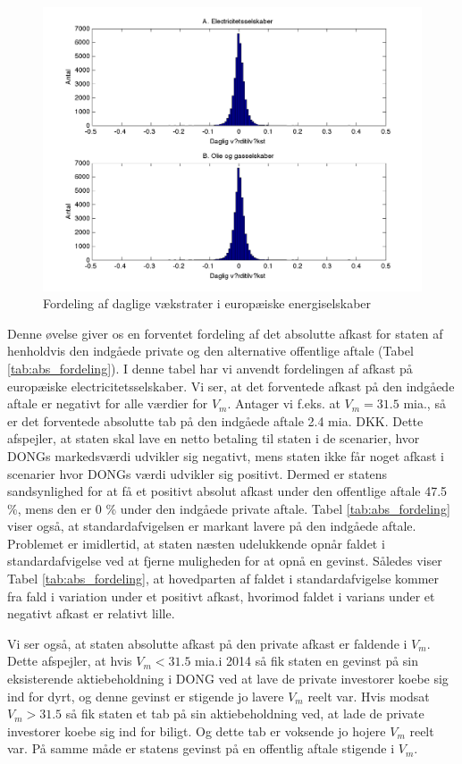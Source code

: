 \documentclass{article}
\begin{document}
\begin{figure}
\includegraphics[scale=0.8]{../matlab/figs/data_hist}
\caption{Fordeling af daglige v\ae{}kstrater i europ\ae{}iske energiselskaber}
\label{fig:data_hist}
\end{figure}

Denne øvelse giver os en forventet fordeling af det absolutte afkast for staten af henholdvis den indgåede private og den alternative offentlige aftale (Tabel \ref{tab:abs_fordeling}). I denne tabel har vi anvendt fordelingen af afkast på europæiske electricitetsselskaber. Vi ser, at det forventede afkast på den indgåede aftale er negativt for alle værdier for $V_m$. Antager vi f.eks. at $V_m=31.5$ mia., så er det forventede absolutte tab på den indgåede aftale 2.4 mia. DKK. Dette afspejler, at staten skal lave en netto betaling til staten i de scenarier, hvor DONGs markedsværdi udvikler sig negativt, mens staten ikke får noget afkast i scenarier hvor DONGs værdi udvikler sig positivt. Dermed er statens sandsynlighed for at få et positivt absolut afkast under den offentlige aftale 47.5 \%, mens den er 0 \% under den indgåede private aftale. Tabel \ref{tab:abs_fordeling} viser også, at standardafvigelsen er markant lavere på den indgåede aftale. Problemet er imidlertid, at staten næsten udelukkende opnår faldet i standardafvigelse ved at fjerne muligheden for at opnå en gevinst. Således viser Tabel \ref{tab:abs_fordeling}, at hovedparten af faldet i standardafvigelse kommer fra fald i variation under et positivt afkast, hvorimod faldet i varians under et negativt afkast er relativt lille.

Vi ser også, at staten absolutte afkast på den private afkast er faldende i $V_m$. Dette afspejler, at hvis $V_m<31.5$ mia.i 2014 så fik staten en gevinst på sin eksisterende aktiebeholdning i DONG ved at lave de private investorer koebe sig ind for dyrt, og denne gevinst er stigende jo lavere $V_m$ reelt var. Hvis modsat $V_m>31.5$ så fik staten et tab på sin aktiebeholdning ved, at lade de private investorer koebe sig ind for biligt. Og dette tab er voksende jo hojere $V_m$ reelt var. På samme måde er statens gevinst på en offentlig aftale stigende i $V_m$.
\end{document}
